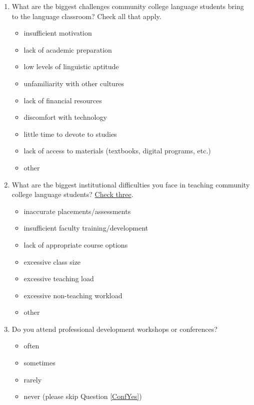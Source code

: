 \documentclass[letterpaper,10pt]{article}
\begin{document}
\begin{enumerate}[resume]
\item What are the biggest challenges community college language students bring to the language classroom? Check all that apply.
\vspace{-0.1in}\begin{multicols}{2}
\begin{itemize}
	\item insufficient motivation
	\item lack of academic preparation
	\item low levels of linguistic aptitude
	\item unfamiliarity with other cultures
	\item lack of financial resources
	\item discomfort with technology
	\item little time to devote to studies
	\item lack of access to materials (textbooks, digital programs, etc.)
	\item other \underline{\hspace{2in}}
\end{itemize}
\end{multicols}

\item What are the biggest institutional difficulties you face in teaching community college language students? \uline{Check three}.
\vspace{-0.1in}\begin{multicols}{2}
\begin{itemize}
	\item inaccurate placements/assessments
	\item insufficient faculty training/development
	\item lack of appropriate course options
	\item excessive class size
	\item excessive teaching load
	\item excessive non-teaching workload
	\item other \underline{\hspace{2in}}
\end{itemize}
\end{multicols}


\item Do you attend professional development workshops or conferences?
\vspace{-0.1in}\begin{multicols}{2}
\begin{itemize}
	\item often
	\item sometimes
	\item rarely
	\item never (please skip Question \ref{ConfYes})
\end{itemize}
\end{multicols}


\end{enumerate}
\end{document}
